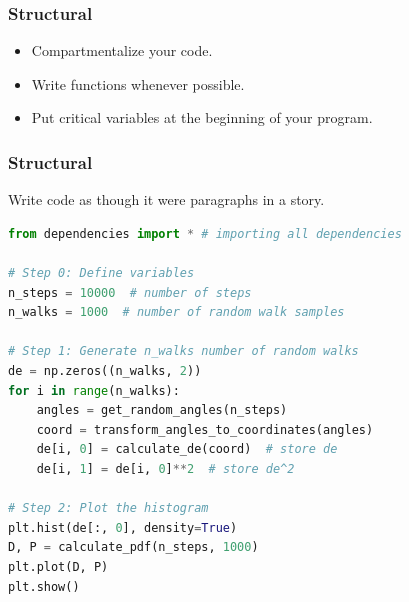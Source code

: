 \begin{frame}[fragile]
  \frametitle{Structural}
  \begin{itemize}
      \item Compartmentalize your code.
      \item Write functions whenever possible.
      \item Put critical variables at the beginning of your program.
  \end{itemize}  
\end{frame}

\begin{frame}[fragile]
  \frametitle{Structural}
    Write code as though it were paragraphs in a story.
    \begin{lstlisting}[language=Python]
from dependencies import * # importing all dependencies

# Step 0: Define variables
n_steps = 10000  # number of steps
n_walks = 1000  # number of random walk samples

# Step 1: Generate n_walks number of random walks
de = np.zeros((n_walks, 2))
for i in range(n_walks):
    angles = get_random_angles(n_steps)
    coord = transform_angles_to_coordinates(angles)
    de[i, 0] = calculate_de(coord)  # store de
    de[i, 1] = de[i, 0]**2  # store de^2

# Step 2: Plot the histogram
plt.hist(de[:, 0], density=True)
D, P = calculate_pdf(n_steps, 1000)
plt.plot(D, P)
plt.show()
    \end{lstlisting}
\end{frame}


